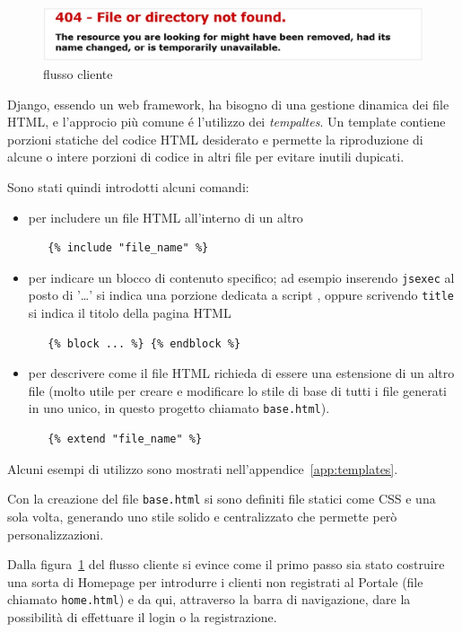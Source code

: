 \begin{figure}
 \includegraphics[width=1\textwidth]{images/filenotfound} 
 \caption{flusso cliente}
 \label{fig:flusso-cliente}
\end{figure}

Django, essendo un web framework, ha bisogno di una gestione dinamica dei file HTML, e l'approcio più comune é l'utilizzo dei \emph{tempaltes}.
Un template contiene porzioni statiche del codice HTML desiderato e permette la riproduzione di alcune o intere porzioni di codice in altri file per evitare inutili dupicati.

Sono stati quindi introdotti alcuni comandi:
\begin{itemize}
 \item per includere un file HTML all'interno di un altro
  \begin{verbatim} 
   {% include "file_name" %} 
  \end{verbatim}
 \item per indicare un blocco di contenuto specifico; ad esempio inserendo \texttt{jsexec} al posto di '{\dots}' si indica una porzione dedicata a script {\js}, oppure scrivendo \texttt{title} si indica il titolo della pagina HTML
  \begin{verbatim} 
   {% block ... %} {% endblock %}
  \end{verbatim}
 \item per descrivere come il file HTML richieda di essere una estensione di un altro file (molto utile per creare e modificare lo stile di base di tutti i file generati in uno unico, in questo progetto chiamato \texttt{base.html}).
  \begin{verbatim} 
   {% extend "file_name" %} 
  \end{verbatim} 
\end{itemize}
Alcuni esempi di utilizzo sono mostrati nell'appendice~\ref{app:templates}.

Con la creazione del file \texttt{base.html} si sono definiti file statici come CSS e {\js} una sola volta, generando uno stile solido e centralizzato che permette però personalizzazioni.

Dalla figura~\ref{fig:flusso-cliente} del flusso cliente si evince come il primo passo sia stato costruire una sorta di Homepage per introdurre i clienti non registrati al Portale (file chiamato \texttt{home.html}) e da qui, attraverso la barra di navigazione, dare la possibilità di effettuare il login o la registrazione.

